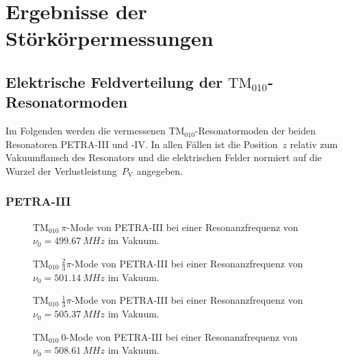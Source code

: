 \chapter{Ergebnisse der Störkörpermessungen}
\label{sec:appendix_felder}

\section{Elektrische Feldverteilung der $\mathrm{TM}_{010}$-Resonatormoden}
\label{app:tm010_felder}
Im Folgenden werden die vermessenen $\mathrm{TM}_{010}$-Resonatormoden der beiden Resonatoren PETRA-III und -IV.
In allen Fällen ist die Position~$z$ relativ zum Vakuumflansch des Resonators und die elektrischen Felder normiert auf die Wurzel der Verlustleistung~$P_\mathrm{V}$ angegeben.

\subsection{PETRA-III}
\FloatBarrier
\begin{figure}[h]
  \centering
  
  \caption{$\mathrm{TM}_{010}~\pi$-Mode von PETRA-III bei einer Resonanzfrequenz von $\nu_0 = \SI{499.67}{MHz}$ im Vakuum.}
\end{figure}

\begin{figure}[h]
  \centering
  
  \caption{$\mathrm{TM}_{010}~\frac{2}{3}\pi$-Mode von PETRA-III bei einer Resonanzfrequenz von $\nu_0 = \SI{501.14}{MHz}$ im Vakuum.}
\end{figure}

\begin{figure}[h]
  \centering
  
  \caption{$\mathrm{TM}_{010}~\frac{1}{3}\pi$-Mode von PETRA-III bei einer Resonanzfrequenz von $\nu_0 = \SI{505.37}{MHz}$ im Vakuum.}
\end{figure}

\begin{figure}[h]
  \centering
  
  \caption{$\mathrm{TM}_{010}~0$-Mode von PETRA-III bei einer Resonanzfrequenz von $\nu_0 = \SI{508.61}{MHz}$ im Vakuum.}
\end{figure}
\FloatBarrier


